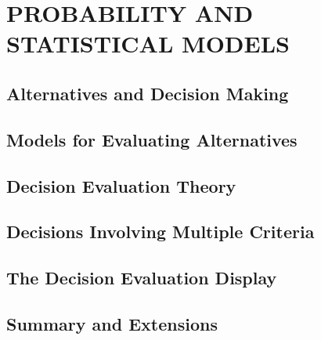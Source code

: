 \chapter{PROBABILITY AND STATISTICAL MODELS}\label{chap:10}

\section{Alternatives and Decision Making}


\section{Models for Evaluating Alternatives}


\section{Decision Evaluation Theory}


\section{Decisions Involving Multiple Criteria}


\section{The Decision Evaluation Display}


\section{Summary and Extensions}



